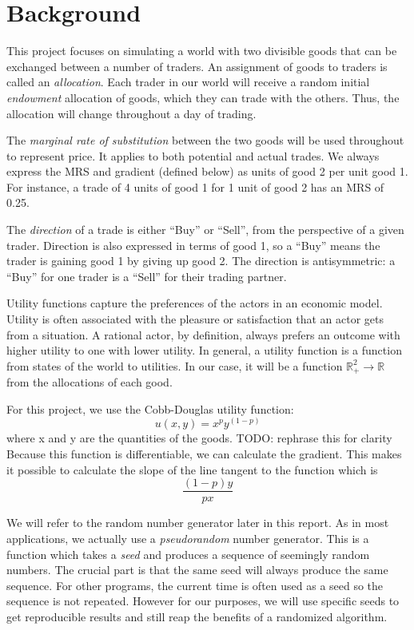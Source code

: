 \documentclass[12pt,a4paper,titlepage]{article}
\begin{document}
\section{Background}\label{background}

This project focuses on simulating a world with two divisible goods that can be exchanged between a number of traders.
An assignment of goods to traders is called an \textit{allocation}.
Each trader in our world will receive a random initial \textit{endowment} allocation of goods, which they can trade with the others.
Thus, the allocation will change throughout a day of trading.

The \textit{marginal rate of substitution} between the two goods will be used throughout to represent price.
It applies to both potential and actual trades.
We always express the MRS and gradient (defined below) as units of good 2 per unit good 1.
For instance, a trade of 4 units of good 1 for 1 unit of good 2 has an MRS of 0.25.

The \textit{direction} of a trade is either ``Buy'' or ``Sell'', from the perspective of a given trader.
Direction is also expressed in terms of good 1, so a ``Buy'' means the trader is gaining good 1 by giving up good 2.
The direction is antisymmetric: a ``Buy'' for one trader is a ``Sell'' for their trading partner.

Utility functions capture the preferences of the actors in an economic model.
Utility is often associated with the pleasure or satisfaction that an actor gets from a situation.
A rational actor, by definition, always prefers an outcome with higher utility to one with lower utility. 
In general, a utility function is a function from states of the world to utilities.
In our case, it will be a function $\mathbb{R}^2_+ \rightarrow \mathbb{R}$ from the allocations of each good.

For this project, we use the Cobb-Douglas utility function:
\[
  u(x, y) = x^p y^{(1-p)}
\]
where x and y are the quantities of the goods.
TODO: rephrase this for clarity
Because this function is differentiable, we can calculate the gradient.
This makes it possible to calculate the slope of the line tangent to the function which is 
\[
  \frac{(1-p)y}{px}
\]

We will refer to the random number generator later in this report.
As in most applications, we actually use a \textit{pseudorandom} number generator.
This is a function which takes a \textit{seed} and produces a sequence of seemingly random numbers.
The crucial part is that the same seed will always produce the same sequence.
For other programs, the current time is often used as a seed so the sequence is not repeated.
However for our purposes, we will use specific seeds to get reproducible results and still reap the benefits of a randomized algorithm.
\end{document}
